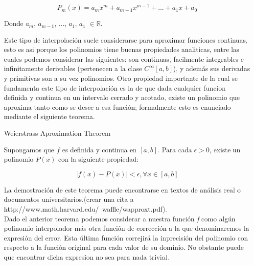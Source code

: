 \begin{equation}
	 P_m(x) = a_mx^m + a_{m-1}x^{m-1} + \dots + a_1x + a_0
\end{equation}

Donde $a_m$, $a_{m-1}$, $\dots$, $a_1$, $a_1$ $\in \mathbb{R}$.

Este tipo de interpolación suele considerarse para aproximar funciones continuas, esto es asi porque los polinomios tiene buenas propiedades analiticas, entre las cuales podemos considerar las siguientes: son continuas, facilmente integrables e infinitamente derivables (pertenecen a la clase $C^{\infty}[a, b]$), y además sus derivadas y primitivas son a su vez polinomios. Otro propiedad importante de la cual se fundamenta este tipo de interpolación es la de que dada cualquier funcion definida y continua en un intervalo cerrado y acotado, existe un polinomio que aproxima tanto como se desee a esa función; formalmente esto es enunciado mediante el siguiente teorema.


\begin{theorem}
	\item Weierstrass Aproximation Theorem
	\item Supongamos que $f$ es definida y continua en $[a, b]$. Para cada $\epsilon > 0$, existe un polinomio $P(x)$ con la siguiente propiedad:	
\end{theorem}
\begin{equation}
	 |f(x) - P(x)| < \epsilon, \forall x \in [a, b]
\end{equation}

La demostración de este teorema puede encontrarse en textos de análisis real o documentos universitarios.(crear una cita a http://www.math.harvard.edu/~waffle/wapproxt.pdf).\vspace{2mm}
\\
 Dado el anterior teorema podemos considerar a nuestra función \textit{f} como algún polinomio interpolador más otra función de corrección a la que denominaremos la expresión del error. Esta última función correjirá la inprecisión del polinomio con respecto a la función original para cada valor de su dominio. No obstante puede que encontrar dicha expresion no sea para nada trivial.

